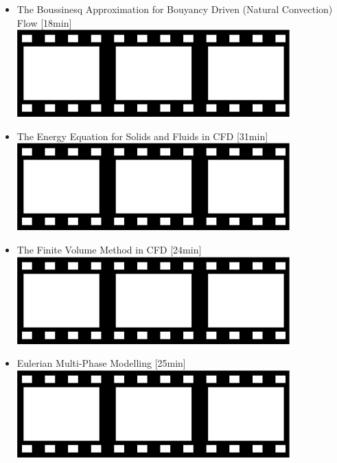 \begin{itemize}
\item The Boussinesq Approximation for Bouyancy Driven (Natural Convection) Flow [18min]
      \href{https://www.youtube.com/watch?v=onKiVbKSoXw}{\includegraphics[width=.8cm]{images/pictograms/film.png}}

\item The Energy Equation for Solids and Fluids in CFD [31min]
      \href{https://www.youtube.com/watch?v=z8dZHze_EPo}{\includegraphics[width=.8cm]{images/pictograms/film.png}}

\item The Finite Volume Method in CFD [24min] 
      \href{https://www.youtube.com/watch?v=E9_kyXjtRHc}{\includegraphics[width=.8cm]{images/pictograms/film.png}}

\item Eulerian Multi-Phase Modelling [25min]
      \href{https://www.youtube.com/watch?v=6BJauDTpCmo}{\includegraphics[width=.8cm]{images/pictograms/film.png}}

\end{itemize}


